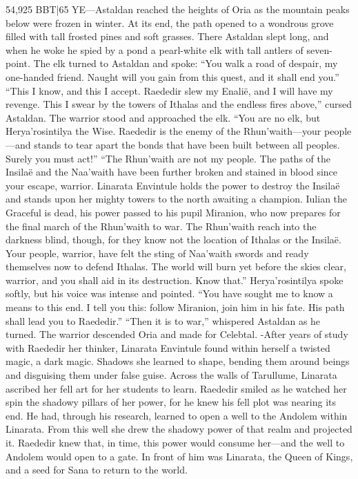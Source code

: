 \documentclass[smalldemyvopaper,11pt,twoside,onecolumn,openright,extrafontsizes]{memoir}
\begin{document}
54,925 BBT|65 YE—Astaldan reached the heights of Oria as the mountain peaks below were frozen in winter. At its end, the path opened to a wondrous grove filled with tall frosted pines and soft grasses. There Astaldan slept long, and when he woke he spied by a pond a pearl-white elk with tall antlers of seven-point. The elk turned to Astaldan and spoke: “You walk a road of despair, my one-handed friend. Naught will you gain from this quest, and it shall end you.”
	“This I know, and this I accept. Raededir slew my Enalië, and I will have my revenge. This I swear by the towers of Ithalas and the endless fires above,” cursed Astaldan. The warrior stood and approached the elk. “You are no elk, but Herya’rosintilya the Wise. Raededir is the enemy of the Rhun’waith—your people—and stands to tear apart the bonds that have been built between all peoples. Surely you must act!”
	“The Rhun’waith are not my people. The paths of the Insilaë and the Naa’waith have been further broken and stained in blood since your escape, warrior. Linarata Envintule holds the power to destroy the Insilaë and stands upon her mighty towers to the north awaiting a champion. Iulian the Graceful is dead, his power passed to his pupil Miranion, who now prepares for the final march of the Rhun’waith to war. The Rhun’waith reach into the darkness blind, though, for they know not the location of Ithalas or the Insilaë. Your people, warrior, have felt the sting of Naa’waith swords and ready themselves now to defend Ithalas. The world will burn yet before the skies clear, warrior, and you shall aid in its destruction. Know that.” Herya’rosintilya spoke softly, but his voice was intense and pointed. “You have sought me to know a means to this end. I tell you this: follow Miranion, join him in his fate. His path shall lead you to Raededir.”
	“Then it is to war,” whispered Astaldan as he turned. The warrior descended Oria and made for Celebtal.
-After years of study with Raededir her thinker, Linarata Envintule found within herself a twisted magic, a dark magic. Shadows she learned to shape, bending them around beings and disguising them under false guise.  Across the walls of Tarullume, Linarata ascribed her fell art for her students to learn. Raededir smiled as he watched her spin the shadowy pillars of her power, for he knew his fell plot was nearing its end. He had, through his research, learned to open a well to the Andolem within Linarata. From this well she drew the shadowy power of that realm and projected it. Raededir knew that, in time, this power would consume her—and the well to Andolem would open to a gate. In front of him was Linarata, the Queen of Kings, and a seed for Sana to return to the world.
\end{document}
